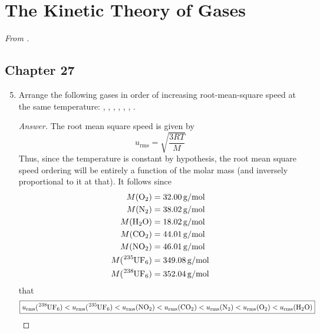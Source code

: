 \documentclass[../psets.tex]{subfiles}
\begin{document}
\section{The Kinetic Theory of Gases}
\emph{From \textcite{bib:McQuarrieSimon}.}
\subsection*{Chapter 27}
\begin{enumerate}[label={\textbf{27-\arabic*.}},leftmargin=3.5em]
    \setcounter{enumi}{4}
    \item {}Arrange the following gases in order of increasing root-mean-square speed at the same temperature: , , , , , , .
    \begin{proof}[Answer]
        The root mean square speed is given by
        \begin{equation*}
            u_\text{rms} = \sqrt{\frac{3RT}{M}}
        \end{equation*}
        Thus, since the temperature is constant by hypothesis, the root mean square speed ordering will be entirely a function of the molar mass (and inversely proportional to it at that). It follows since
        \begin{align*}
            M(\ce{O2})        &= \SI[per-mode=symbol]{32.00}{\gram\per\mole}\\
            M(\ce{N2})        &= \SI[per-mode=symbol]{38.02}{\gram\per\mole}\\
            M(\ce{H2O})       &= \SI[per-mode=symbol]{18.02}{\gram\per\mole}\\
            M(\ce{CO2})       &= \SI[per-mode=symbol]{44.01}{\gram\per\mole}\\
            M(\ce{NO2})       &= \SI[per-mode=symbol]{46.01}{\gram\per\mole}\\
            M(\ce{{}^235UF6}) &= \SI[per-mode=symbol]{349.08}{\gram\per\mole}\\
            M(\ce{{}^238UF6}) &= \SI[per-mode=symbol]{352.04}{\gram\per\mole}
        \end{align*}
        that
        \begin{equation*}
            \boxed{
                u_\text{rms}(\ce{{}^238UF6}) < u_\text{rms}(\ce{{}^235UF6})
                < u_\text{rms}(\ce{NO2})
                < u_\text{rms}(\ce{CO2})
                < u_\text{rms}(\ce{N2})
                < u_\text{rms}(\ce{O2})
                < u_\text{rms}(\ce{H2O})
            }

\end{equation*}
\end{proof}
\end{enumerate}
\end{document}
